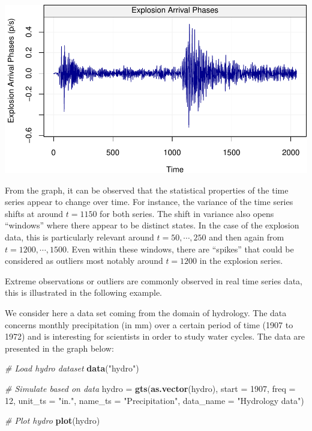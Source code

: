 \documentclass[]{book}
\newenvironment{Shaded}{\begin{snugshade}}{\end{snugshade}}
\newcommand{\KeywordTok}[1]{\textcolor[rgb]{0.13,0.29,0.53}{\textbf{#1}}}
\newcommand{\DataTypeTok}[1]{\textcolor[rgb]{0.13,0.29,0.53}{#1}}
\newcommand{\DecValTok}[1]{\textcolor[rgb]{0.00,0.00,0.81}{#1}}
\newcommand{\StringTok}[1]{\textcolor[rgb]{0.31,0.60,0.02}{#1}}
\newcommand{\CommentTok}[1]{\textcolor[rgb]{0.56,0.35,0.01}{\textit{#1}}}
\newcommand{\NormalTok}[1]{#1}
\theoremstyle{definition}
\theoremstyle{definition}
\theoremstyle{definition}
\theoremstyle{remark}
\let\BeginKnitrBlock\begin \let\EndKnitrBlock\end
\begin{document}
\begin{center}\includegraphics{ts_files/figure-latex/example_EQ-2} \end{center}

From the graph, it can be observed that the statistical properties of
the time series appear to change over time. For instance, the variance
of the time series shifts at around \(t = 1150\) for both series. The
shift in variance also opens ``windows'' where there appear to be
distinct states. In the case of the explosion data, this is particularly
relevant around \(t = 50, \cdots, 250\) and then again from
\(t = 1200, \cdots, 1500\). Even within these windows, there are
``spikes'' that could be considered as outliers most notably around
\(t = 1200\) in the explosion series.

Extreme observations or outliers are commonly observed in real time
series data, this is illustrated in the following example.

\BeginKnitrBlock{example}
\protect\hypertarget{exm:precipitation}{}{\label{exm:precipitation} }We
consider here a data set coming from the domain of hydrology. The data
concerns monthly precipitation (in mm) over a certain period of time
(1907 to 1972) and is interesting for scientists in order to study water
cycles. The data are presented in the graph below:
\EndKnitrBlock{example}

\begin{Shaded}
\begin{Highlighting}[]
\CommentTok{# Load hydro dataset}
\KeywordTok{data}\NormalTok{(}\StringTok{"hydro"}\NormalTok{)}

\CommentTok{# Simulate based on data}
\NormalTok{hydro =}\StringTok{ }\KeywordTok{gts}\NormalTok{(}\KeywordTok{as.vector}\NormalTok{(hydro), }\DataTypeTok{start =} \DecValTok{1907}\NormalTok{, }\DataTypeTok{freq =} \DecValTok{12}\NormalTok{, }\DataTypeTok{unit_ts =} \StringTok{"in."}\NormalTok{, }
            \DataTypeTok{name_ts =} \StringTok{"Precipitation"}\NormalTok{, }\DataTypeTok{data_name =} \StringTok{"Hydrology data"}\NormalTok{)}

\CommentTok{# Plot hydro }
\KeywordTok{plot}\NormalTok{(hydro)}
\end{Highlighting}
\end{Shaded}
\end{document}
